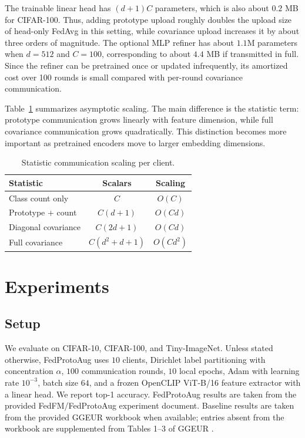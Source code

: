 ﻿\documentclass[conference]{IEEEtran}
\newcommand{\method}{FedProtoAug}
\begin{document}
The trainable linear head has $(d+1)C$ parameters, which is also about $0.2$ MB for CIFAR-100. Thus, adding prototype upload roughly doubles the upload size of head-only FedAvg in this setting, while covariance upload increases it by about three orders of magnitude. The optional MLP refiner has about $1.1$M parameters when $d=512$ and $C=100$, corresponding to about $4.4$ MB if transmitted in full. Since the refiner can be pretrained once or updated infrequently, its amortized cost over 100 rounds is small compared with per-round covariance communication.

Table~\ref{tab:comm_scaling} summarizes asymptotic scaling. The main difference is the statistic term: prototype communication grows linearly with feature dimension, while full covariance communication grows quadratically. This distinction becomes more important as pretrained encoders move to larger embedding dimensions.

\begin{table}[t]
\centering
\caption{Statistic communication scaling per client.}
\label{tab:comm_scaling}
\begin{tabular}{lcc}
\toprule
Statistic & Scalars & Scaling \\
\midrule
Class count only & $C$ & $O(C)$ \\
Prototype + count & $C(d+1)$ & $O(Cd)$ \\
Diagonal covariance & $C(2d+1)$ & $O(Cd)$ \\
Full covariance & $C(d^2+d+1)$ & $O(Cd^2)$ \\
\bottomrule
\end{tabular}
\end{table}

\section{Experiments}

\subsection{Setup}
We evaluate on CIFAR-10, CIFAR-100, and Tiny-ImageNet. Unless stated otherwise, \method{} uses $10$ clients, Dirichlet label partitioning with concentration $\alpha$, $100$ communication rounds, $10$ local epochs, Adam with learning rate $10^{-3}$, batch size $64$, and a frozen OpenCLIP ViT-B/16 feature extractor \cite{ilharco2021openclip} with a linear head. We report top-1 accuracy. \method{} results are taken from the provided FedFM/FedProtoAug experiment document. Baseline results are taken from the provided GGEUR workbook when available; entries absent from the workbook are supplemented from Tables 1--3 of GGEUR \cite{ma2025ggeur}.
\end{document}
